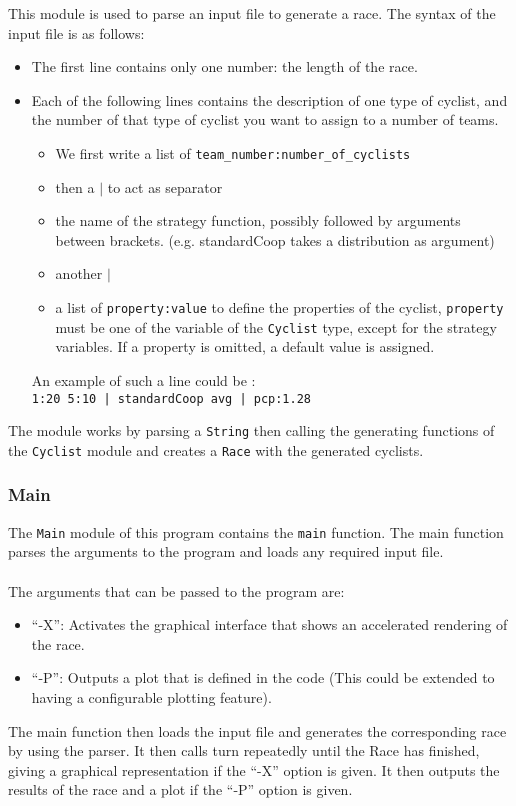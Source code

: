 \documentclass[10pt, a4paper]{report}
\begin{document}
This module is used to parse an input file to generate a race. The syntax of the input file is as follows:
\begin{itemize}
\item The first line contains only one number: the length of the race.

\item Each of the following lines contains the description of one type of cyclist, and the number of that type of cyclist you want to assign to a number of teams.
\begin{itemize}
\item We first write a list of \texttt{team\_number:number\_of\_cyclists}
\item then a $|$ to act as separator
\item the name of the strategy function, possibly followed by arguments between brackets. (e.g. standardCoop takes a distribution as argument)
\item another $|$
\item a list of \texttt{property:value} to define the properties of the cyclist, \texttt{property} must be one of the variable of the \texttt{Cyclist} type, except for the strategy variables. If a property is omitted, a default value is assigned.
\end{itemize}
An example of such a line could be : \\ \texttt{1:20 5:10 | standardCoop avg | pcp:1.28}
\end{itemize}
The module works by parsing a \texttt{String} then calling the generating functions of the \texttt{Cyclist} module and creates a \texttt{Race} with the generated cyclists.

\subsubsection{Main}

The \texttt{Main} module of this program contains the \texttt{main} function.
The main function parses the arguments to the program and loads any required input file.\\\\
The arguments that can be passed to the program are:
\begin{itemize}
\item ``-X'': Activates the graphical interface that shows an accelerated rendering of the race.
\item ``-P'': Outputs a plot that is defined in the code (This could be extended to having a configurable plotting feature).
\end{itemize}
The main function then loads the input file and generates the corresponding race by using the parser. It then calls turn repeatedly until the Race has finished, giving a graphical representation if the ``-X'' option is given. It then outputs the results of the race and a plot if the ``-P'' option is given.
\end{document}
